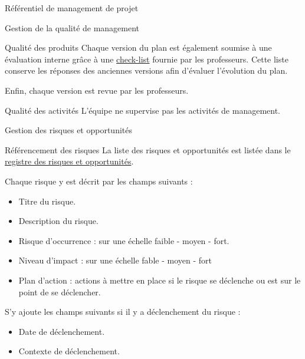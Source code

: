 \documentclass[]{article}
\begin{document}
{\begin{section}{\label{sec:Référentiel de management de projet}Référentiel de management de projet}
\begin{subsection}{\label{sec:Gestion de la qualité de management}Gestion de la qualité de management}
\begin{subsubsection}{\label{sec:Qualité des produits}Qualité des produits}
             Chaque version du plan est également soumise à une évaluation interne grâce à une \href{Check_list.ods}{check-list} fournie par les professeurs. Cette liste conserve les réponses des anciennes versions afin d’évaluer l’évolution du plan.

             Enfin, chaque version est revue par les professeurs.
         \end{subsubsection}

         \begin{subsubsection}{\label{sec:Qualité des activités}Qualité des activités}
             L’équipe ne supervise pas les activités de management.
         \end{subsubsection}
     \end{subsection}

     \begin{subsection}{\label{sec:Gestion des risques et opportunités}Gestion des risques et opportunités}
         \begin{subsubsection}{\label{sec:Référencement des risques}Référencement des risques}
             La liste des risques et opportunités est listée dans le \href{documents/Registre_des_risques.pdf}{registre des risques et opportunités}.

             Chaque risque y est décrit par les champs suivants :
             \begin{itemize}
                 \item Titre du risque.
                 \item Description du risque.
                 \item Risque d’occurrence : sur une échelle faible - moyen - fort.
                 \item Niveau d'impact : sur une échelle fable - moyen - fort
                 \item Plan d'action : actions à mettre en place si le risque se déclenche ou est sur le point de se déclencher.
             \end{itemize}

             S'y ajoute les champs suivants si il y a déclenchement du risque :
             \begin{itemize}
                 \item Date de déclenchement.
                 \item Contexte de déclenchement.
             \end{itemize}
         \end{subsubsection}


\end{subsection}
\end{section}}
\end{document}
